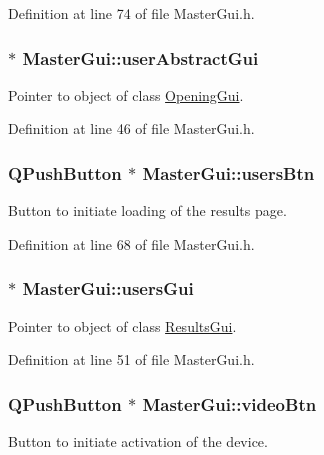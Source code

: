 Definition at line 74 of file Master\-Gui.\-h.

\hypertarget{class_master_gui_ad43d7e616be991aeb2daca46193591b6}{
\subsubsection[{user\-Abstract\-Gui}]{ $\ast$ Master\-Gui\-::user\-Abstract\-Gui\hspace{0.3cm}{\ttfamily [private]}}}\label{class_master_gui_ad43d7e616be991aeb2daca46193591b6}
Pointer to object of class \hyperlink{class_opening_gui}{Opening\-Gui}. 

Definition at line 46 of file Master\-Gui.\-h.

\hypertarget{class_master_gui_ae6e5539441bee1507155d259ec0cf766}{
\subsubsection[{users\-Btn}]{\setlength{\rightskip}{0pt plus 5cm}Q\-Push\-Button $\ast$ Master\-Gui\-::users\-Btn\hspace{0.3cm}{\ttfamily [private]}}}\label{class_master_gui_ae6e5539441bee1507155d259ec0cf766}
Button to initiate loading of the results page. 

Definition at line 68 of file Master\-Gui.\-h.

\hypertarget{class_master_gui_a4a314e7fef28e27227053b92eaad6b0c}{
\subsubsection[{users\-Gui}]{ $\ast$ Master\-Gui\-::users\-Gui\hspace{0.3cm}{\ttfamily [private]}}}\label{class_master_gui_a4a314e7fef28e27227053b92eaad6b0c}
Pointer to object of class \hyperlink{class_results_gui}{Results\-Gui}. 

Definition at line 51 of file Master\-Gui.\-h.

\hypertarget{class_master_gui_ab9232b4e6cf41eec9f72fbd2157b231d}{
\subsubsection[{video\-Btn}]{\setlength{\rightskip}{0pt plus 5cm}Q\-Push\-Button $\ast$ Master\-Gui\-::video\-Btn\hspace{0.3cm}{\ttfamily [private]}}}\label{class_master_gui_ab9232b4e6cf41eec9f72fbd2157b231d}
Button to initiate activation of the device. 


